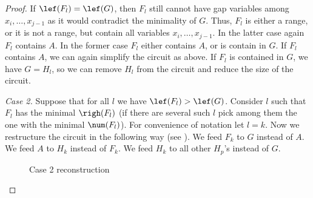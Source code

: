 \documentclass{toc}
\begin{document}
\begin{proof}[Proof]
    If $\lef(F_l) = \lef(G)$, then $F_l$ still cannot have gap variables among $x_i, \ldots, x_{j-1}$ as it would contradict the minimality of $G$. Thus, $F_l$ is either a range, or it is not a range, but contain all variables $x_i, \ldots, x_{j-1}$. In the latter case again $F_l$ contains $A$. In the former case $F_l$ either contains $A$, or is contain in $G$. If $F_l$ contains $A$, we can again simplify the circuit as above. If $F_l$ is contained in $G$, we have $G=H_l$, so we can remove $H_l$ from the circuit and reduce the size of the circuit.

    \emph{Case 2.} Suppose that for all $l$ we have $\lef(F_l)>\lef(G)$. Consider $l$ such that $F_l$ has the minimal $\righ(F_l)$ (if there are several such $l$ pick among them the one with the minimal $\num(F_l)$). For convenience of notation let $l=k$. Now we restructure the circuit in the following way (see ). We feed $F_k$ to $G$ instead of $A$. We feed $A$ to $H_k$ instead of $F_k$. We feed $H_k$ to all other $H_p$'s instead of $G$.

    \begin{figure}[ht]
        \begin{center}
        \end{center}
        \caption{Case 2 reconstruction} \label{fig:after}
    \end{figure}


\end{proof}
\end{document}
